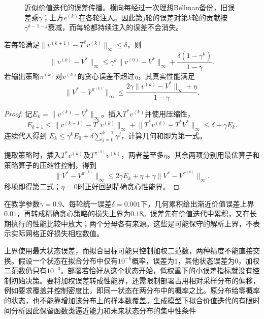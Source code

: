 \begin{figure}[htbp]
 \centering
 
 \caption{近似价值迭代的误差传播。横向每经过一次理想Bellman备份，旧误差乘$\gamma$；上方$e^{(k)}$在各轮注入。因此第$j$轮的误差对第$k$轮的贡献按$\gamma^{k-1-j}$衰减，而每轮都持续注入的误差不会消失。}
 \label{fig:rl-planning-error-flow}
\end{figure}

\begin{theorem}[近似价值迭代的统一误差界]
 \label{thm:rl-planning-avi-error}
 若每轮满足$\lVert v^{(k+1)}-T^*v^{(k)}\rVert_\infty\leq\delta$，则
 \begin{equation}
 \lVert v^{(k)}-V^*\rVert_\infty
 \leq\gamma^k\lVert v^{(0)}-V^*\rVert_\infty
       +\frac{\delta(1-\gamma^k)}{1-\gamma}.
 \label{eq:rl-planning-avi-error}
 \end{equation}
 若输出策略$\pi^{(k)}$对$v^{(k)}$的贪心误差不超过$\eta$，其真实性能满足
 \[
 \lVert V^*-V^{\pi^{(k)}}\rVert_\infty
 \leq\frac{2\gamma\lVert v^{(k)}-V^*\rVert_\infty+\eta}{1-\gamma}.
 \]
\end{theorem}
\begin{proof}
 记$E_k=\lVert v^{(k)}-V^*\rVert_\infty$。插入$T^*v^{(k)}$并使用压缩性，
 \[
 E_{k+1}\leq
 \lVert v^{(k+1)}-T^*v^{(k)}\rVert_\infty+
 \lVert T^*v^{(k)}-T^*V^*\rVert_\infty
 \leq\delta+\gamma E_k.
 \]
 连续代入得到
 $E_k\leq\gamma^kE_0+\delta\sum_{j=0}^{k-1}\gamma^j$，计算几何和即为第一式。

 提取策略时，插入$T^*v^{(k)}$及$T^{\pi^{(k)}}v^{(k)}$，两者差至多$\eta$。其余两项分别用最优算子和策略算子的压缩性控制，得到
 \[
 \lVert V^*-V^{\pi^{(k)}}\rVert_\infty
 \leq 2\gamma E_k+\eta+
       \gamma\lVert V^*-V^{\pi^{(k)}}\rVert_\infty.
 \]
 移项即得第二式；$\eta=0$时正好回到精确贪心性能界。
\end{proof}

在教学参数$\gamma=0.9$、每轮统一误差$\delta=0.001$下，几何累积给出渐近价值误差上界$0.01$，再转成精确贪心策略的损失上界为$0.18$。误差先在价值迭代中累积，又在长期执行的性能比较中放大；两个分母各有来源。这些是可能保守的解析上界，不表示实际网格正好损失相应数值。

上界使用最大状态误差，而拟合目标可能只控制加权二范数，两种精度不能直接交换。假设一个状态在拟合分布中仅有$10^{-6}$概率，误差为1，其他状态误差为0，加权二范数仍只有$10^{-3}$。部署若恰好从这个状态开始，低权重下的小误差指标就没有控制初始决策。要将加权误差转成性能界，还需限制部署占用相对采样分布的偏移，例如要求覆盖并控制密度比，即同一状态在两分布中的概率之比。原分布给零概率的状态，也不能靠增加该分布上的样本数覆盖。生成模型下拟合价值迭代的有限时间分析因此保留函数类逼近能力和未来状态分布的集中性条件

